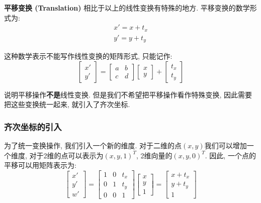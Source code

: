 \textbf{平移变换 (Translation) }相比于以上的线性变换有特殊的地方. 平移变换的数学形式为: 
\begin{equation}
	\begin{split}
		x'=x+t_x\\
		y'=y+t_y
	\end{split}
\end{equation}

这种数学表示不能写作线性变换的矩阵形式, 只能记作: 
\begin{equation}
	\begin{bmatrix}x'\\y'\end{bmatrix}=\begin{bmatrix}a&b\\c&d\end{bmatrix}\begin{bmatrix}x\\y\end{bmatrix}+\begin{bmatrix}t_x\\t_y\end{bmatrix}
\end{equation}

说明平移操作\textbf{不是}线性变换. 但是我们不希望把平移操作看作特殊变换, 因此需要把这些变换统一起来, 就引入了齐次坐标. 

\subsubsection{齐次坐标的引入}

为了统一变换操作, 我们引入一个新的维度. 对于二维的点$(x,y)$我们可以增加一个维度, 对于2维的点可以表示为$(x,y,1)^T$, 2维向量的$(x,y,0)^T$. 因此, 一个点的平移可以用矩阵表示为: 
\begin{equation}
	\begin{bmatrix}x'\\y'\\w'\end{bmatrix}=\begin{bmatrix}1&0&t_x\\0&1&t_y\\0&0&1\end{bmatrix}\begin{bmatrix}x\\y\\1\end{bmatrix}=\begin{bmatrix}x+t_x\\y+t_y\\1\end{bmatrix}
\end{equation}

